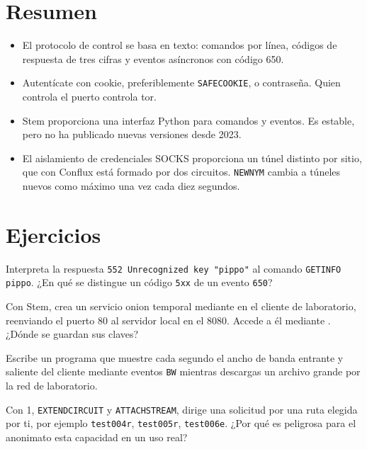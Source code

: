 \section*{Resumen}
\begin{itemize}
  \item El protocolo de control se basa en texto: comandos por línea, códigos de respuesta de tres cifras y eventos asíncronos con código 650.
  \item Autentícate con cookie, preferiblemente \texttt{SAFECOOKIE}, o contraseña. Quien controla el puerto controla tor.
  \item Stem proporciona una interfaz Python para comandos y eventos. Es estable, pero no ha publicado nuevas versiones desde 2023.
  \item El aislamiento de credenciales SOCKS proporciona un túnel distinto por sitio, que con Conflux está formado por dos circuitos. \texttt{NEWNYM} cambia a túneles nuevos como máximo una vez cada diez segundos.
\end{itemize}

\section*{Ejercicios}

\begin{esercizio}[1]\label{es:18-codici}
Interpreta la respuesta \texttt{552 Unrecognized key "pippo"} al comando \texttt{GETINFO pippo}. ¿En qué se distingue un código \texttt{5xx} de un evento \texttt{650}?
\end{esercizio}

\begin{esercizio}[2]\label{es:18-onion}
Con Stem, crea un servicio onion temporal mediante  en el cliente de laboratorio, reenviando el puerto 80 al servidor local en el 8080. Accede a él mediante . ¿Dónde se guardan sus claves?
\end{esercizio}

\begin{esercizio}[2]\label{es:18-banda}
Escribe un programa que muestre cada segundo el ancho de banda entrante y saliente del cliente mediante eventos \texttt{BW} mientras descargas un archivo grande por la red de laboratorio.
\end{esercizio}

\begin{esercizio}[3]\label{es:18-percorso}
Con  1, \texttt{EXTENDCIRCUIT} y \texttt{ATTACHSTREAM}, dirige una solicitud por una ruta elegida por ti, por ejemplo \texttt{test004r}, \texttt{test005r}, \texttt{test006e}. ¿Por qué es peligrosa para el anonimato esta capacidad en un uso real?
\end{esercizio}

